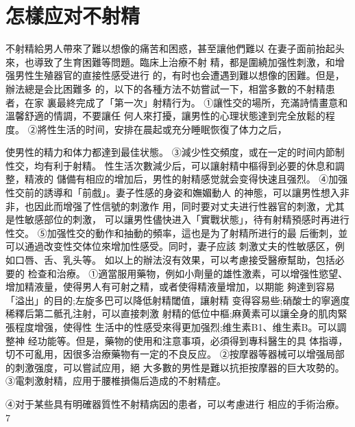 \documentclass[12pt,UTF8]{ctexbook}
\begin{document}
\section{怎樣应对不射精}
不射精給男人帶來了難以想像的痛苦和困惑，甚至讓他們難以
在妻子面前抬起头來，也導致了生育困難等問題。臨床上治療不射
精，都是圍繞加强性刺激，和增强男性生殖器官的直接性感受进行
的，有时也会遭遇到難以想像的困難。但是，辦法總是会比困難多
的，以下的各種方法不妨嘗試一下，相當多數的不射精患者，在家
裏最終完成了「第一次」射精行为。
①讓性交的場所，充滿詩情畫意和溫馨舒適的情調，不要讓任
何人來打擾，讓男性的心理状態達到完全放鬆的程度。
②將性生活的时间，安排在晨起或充分睡眠恢復了体力之后，

使男性的精力和体力都達到最佳状態。
③減少性交頻度，或在一定的时间内節制性交，均有利于射精。
性生活次數減少后，可以讓射精中樞得到必要的休息和調整，精液的
儲備有相应的增加后，男性的射精感觉就会变得快速且强烈。
④加强性交前的誘導和「前戲」。妻子性感的身姿和嫵媚動人
的神態，可以讓男性想入非非，也因此而增强了性信號的刺激作
用，同时要对丈夫进行性器官的刺激，尤其是性敏感部位的刺激，
可以讓男性儘快进入「實戰状態」，待有射精預感时再进行性交。
⑤加强性交的動作和抽動的頻率，這也是为了射精所进行的最
后衝刺，並可以通過改变性交体位來增加性感受。同时，妻子应該
刺激丈夫的性敏感区，例如口唇、舌、乳头等。
如以上的辦法沒有效果，可以考慮接受醫療幫助，包括必要的
检查和治療。
①適當服用藥物，例如小劑量的雄性激素，可以增强性慾望、
增加精液量，使得男人有可射之精，或者使得精液量增加，以期能
夠達到容易「溢出」的目的;左旋多巴可以降低射精閾值，讓射精
变得容易些;硝酸士的寧適度稀釋后第二骶孔注射，可以直接刺激
射精的低位中樞;麻黄素可以讓全身的肌肉緊張程度增强，使得性
生活中的性感受來得更加强烈;维生素B1、维生素B。可以調整神
经功能等。但是，藥物的使用和注意事項，必須得到專科醫生的具
体指導，切不可亂用，因很多治療藥物有一定的不良反应。
②按摩器等器械可以增强局部的刺激强度，可以嘗試应用，絕
大多數的男性是難以抗拒按摩器的巨大攻勢的。
③電刺激射精，应用于腰椎損傷后造成的不射精症。

④对于某些具有明確器質性不射精病因的患者，可以考慮进行
相应的手術治療。
7
\end{document}
